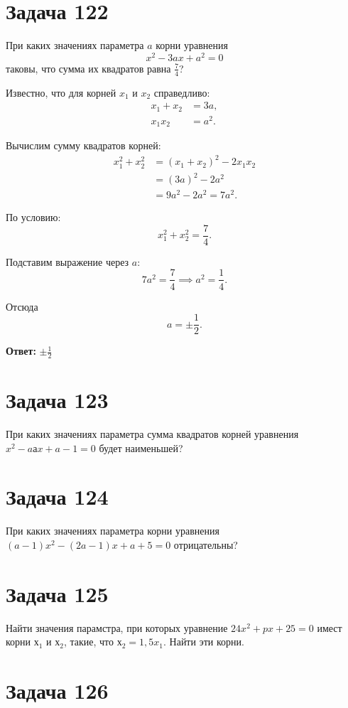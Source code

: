 \documentclass[a4paper,12pt]{article}
\begin{document}
\section{Задача 122}

При каких значениях параметра $a$ корни уравнения
\[
x^2 - 3ax + a^2 = 0
\]
таковы, что сумма их квадратов равна $\frac{7}{4}$?

Известно, что для корней $x_1$ и $x_2$ справедливо:
\begin{align*}
    x_1 + x_2 &= 3a, \\
    x_1 x_2 &= a^2.
\end{align*}

Вычислим сумму квадратов корней:
\begin{align*}
    x_1^2 + x_2^2 &= (x_1 + x_2)^2 - 2 x_1 x_2 \\
    &= (3a)^2 - 2a^2 \\
    &= 9a^2 - 2a^2 = 7a^2.
\end{align*}

По условию:
\[
x_1^2 + x_2^2 = \frac{7}{4}.
\]

Подставим выражение через $a$:
\[
7a^2 = \frac{7}{4} \implies a^2 = \frac{1}{4}.
\]

Отсюда
\[
a = \pm \frac{1}{2}.
\]

\bigskip

\textbf{Ответ:} \(\boxed{\pm \frac{1}{2}}\)

\section{Задача 123}

При каких значениях параметра сумма квадратов корней
уравнения $x^2 - aаx + a - 1 = 0$ будет наименьшей?

\section{Задача 124}

При каких значениях параметра корни уравнения
$(a - 1)x^2 - (2a - 1)x + a + 5 = 0$ отрицательны?

\section{Задача 125}

Найти значения парамстра, при которых уравнение
$24x^2 + px + 25 = 0$ имест корни $х_1$ и $х_2$, такие, что $х_2 = 1,5x_1$.
Найти эти корни.

\section{Задача 126}
\end{document}
